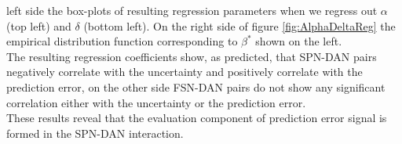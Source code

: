 left side the box-plots of resulting regression parameters when we regress out $\alpha$ (top left) and $\delta$ (bottom left). On the right side of figure \ref{fig:AlphaDeltaReg} the empirical distribution function corresponding to $\beta^*$ shown on the left.\\
The resulting regression coefficients show, as predicted, that SPN-DAN pairs negatively correlate with the uncertainty and positively correlate with the prediction error, on the other side FSN-DAN pairs do not show any significant correlation either with the uncertainty or the prediction error.\\These results reveal that the evaluation component of prediction error signal is formed in the SPN-DAN interaction. 
